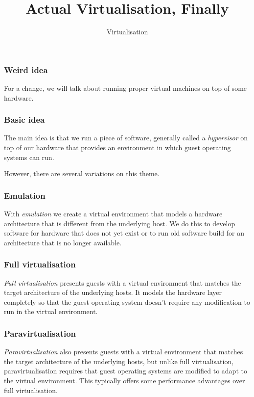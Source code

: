 \documentclass[10pt]{beamer}
\title{Actual Virtualisation, Finally}
\author[I720]{Virtualisation}
\institute[Otago Polytechnic]{
  Otago Polytechnic \\
  Dunedin, New Zealand \\
}
\date{}
\begin{document}
\begin{frame}[plain]
  \titlepage
\end{frame}


\begin{frame}
  \frametitle{Weird idea} 
  For a change, we will talk about running proper virtual machines on top of some hardware.
  \end{frame}
  
\begin{frame}
  \frametitle{Basic idea}
  
  The main idea is that we run a piece of software, generally called a \emph{hypervisor} on top of our 
  hardware that provides an environment in which guest operating systems can run.
   
  However, there are several variations on this theme.
\end{frame}
  
\begin{frame}
  \frametitle{Emulation}
  
   With \emph{emulation} we create a virtual environment that models a hardware architecture that is 
   different from the underlying host. We do this to develop software for hardware that does not yet exist or
   to run old software build for an architecture that is no longer available.
\end{frame}

\begin{frame}
  \frametitle{Full virtualisation}
  
   \emph{Full virtualisation} presents guests with a virtual environment that matches the target architecture of the underlying hosts. It models the hardware layer completely so that the guest operating system doesn't require any modification to run in the virtual environment.
\end{frame}

\begin{frame}
  \frametitle{Paravirtualisation}
  
   \emph{Paravirtualisation} also presents guests with a virtual environment that matches the target architecture of the underlying hosts, but unlike full virtualisation,
   paravirtualisation requires that guest operating systems are modified to adapt to the virtual environment. This typically offers some performance advantages 
   over full virtualisation.
   
\end{frame}
\end{document}
